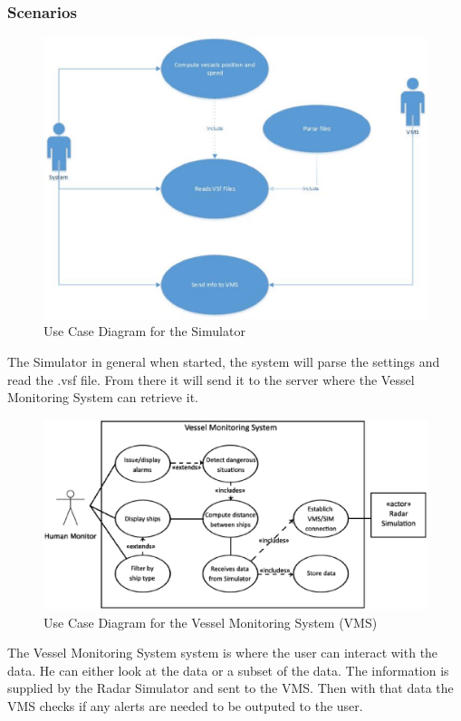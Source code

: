 \documentclass{article}
\begin{document}
\subsubsection{Scenarios} %
\begin{figure}[!htb]
\caption{Use Case Diagram for the Simulator}
\centering
\includegraphics[scale=0.4]{diagrams/usecasediagram.eps}
\end{figure}
The Simulator in general when started, the system will parse the settings and read the .vsf file. From there it will send it to the server where the Vessel Monitoring System can retrieve it.

\begin{figure}[!htb]
\caption{Use Case Diagram for the Vessel Monitoring System (VMS)}
\centering
\includegraphics[scale=0.32]{diagrams/vmsdiagram.eps}
\end{figure}
The Vessel Monitoring System system is where the user can interact with the data. He can either look at the data or a subset of the data. 
The information is supplied by the Radar Simulator and sent to the VMS.
Then with that data the VMS checks if any alerts are needed to be outputed to the user.
\end{document}
